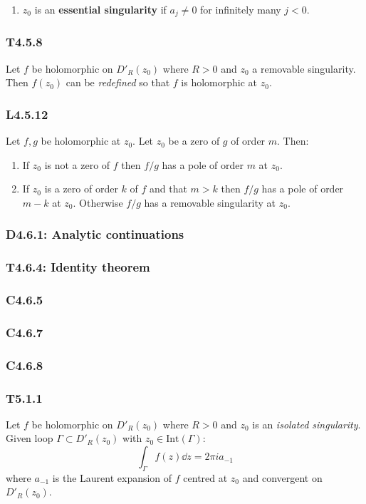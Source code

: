 \documentclass{article}
\begin{document}
\begin{multicols*}{3}
\begin{enumerate}
    \item $z_0$ is an \textbf{essential singularity} if $a_j\neq0$
    for infinitely many $j<0$.
\end{enumerate}

\subsubsection*{T4.5.8}
Let $f$ be holomorphic on $D'_R(z_0)$ where $R>0$ and
$z_0$ a removable singularity. Then $f(z_0)$ can be \textit{redefined}
so that $f$ is holomorphic at $z_0$.

\subsubsection*{L4.5.12}
Let $f,g$ be holomorphic at $z_0$. Let $z_0$ be a zero of $g$ of
order $m$. Then:
\begin{enumerate}
    \item If $z_0$ is not a zero of $f$ then
    $f/g$ has a pole of order $m$ at $z_0$.

    \item If $z_0$ is a zero of order $k$ of $f$ and that $m>k$
    then $f/g$ has a pole of order $m-k$ at $z_0$.
    Otherwise $f/g$ has a removable singularity at $z_0$.
\end{enumerate}

\subsubsection*{D4.6.1: Analytic continuations}

\subsubsection*{T4.6.4: Identity theorem}

\subsubsection*{C4.6.5}

\subsubsection*{C4.6.7}

\subsubsection*{C4.6.8}

\subsubsection*{T5.1.1}
Let $f$ be holomorphic on $D'_R(z_0)$ where $R>0$ and
$z_0$ is an \textit{isolated singularity}.
Given loop $\Gamma\subset D'_R(z_0)$ with $z_0\in\text{Int}(\Gamma)$:
$$\int_{\Gamma}f(z)\dd z=2\pi i a_{-1}$$
where $a_{-1}$ is the Laurent expansion of $f$ centred at $z_0$
and convergent on $D'_R(z_0)$.


\end{multicols*}
\end{document}
